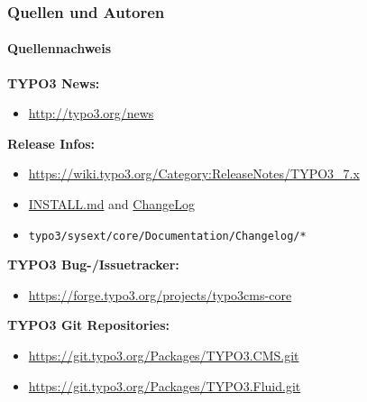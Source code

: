 \begin{frame}[fragile]
	\frametitle{Quellen und Autoren}
	\framesubtitle{Quellennachweis}

	\textbf{TYPO3 News:}
		\begin{itemize}\smaller
			\item \url{http://typo3.org/news}
		\end{itemize}

	\textbf{Release Infos:}
		\begin{itemize}\smaller
			\item \url{https://wiki.typo3.org/Category:ReleaseNotes/TYPO3_7.x}
			\item \href{https://github.com/TYPO3/TYPO3.CMS/blob/master/INSTALL.md}{INSTALL.md} and \href{https://github.com/TYPO3/TYPO3.CMS/blob/master/ChangeLog}{ChangeLog}
			\item \texttt{typo3/sysext/core/Documentation/Changelog/*}
		\end{itemize}

	\textbf{TYPO3 Bug-/Issuetracker:}
		\begin{itemize}\smaller
			\item \url{https://forge.typo3.org/projects/typo3cms-core}
		\end{itemize}

	\textbf{TYPO3 Git Repositories:}
		\begin{itemize}\smaller
			\item \url{https://git.typo3.org/Packages/TYPO3.CMS.git}
			\item \url{https://git.typo3.org/Packages/TYPO3.Fluid.git}
		\end{itemize}

\end{frame}


